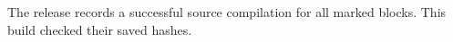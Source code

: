 The release records a successful source compilation for all marked blocks. This build checked their saved hashes.
